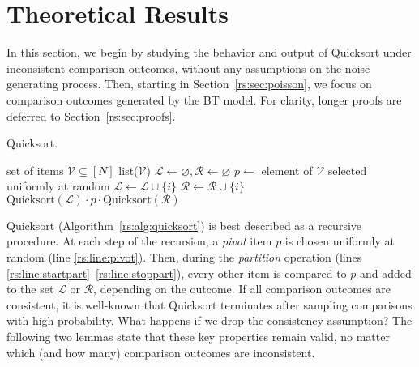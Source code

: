 \section{Theoretical Results}  %
\label{rs:sec:theory}

In this section, we begin by studying the behavior and output of Quicksort under inconsistent comparison outcomes, without any assumptions on the noise generating process.
Then, starting in Section~\ref{rs:sec:poisson}, we focus on comparison outcomes generated by the BT model.
For clarity, longer proofs are deferred to Section~\ref{rs:sec:proofs}.

\begin{algorithm}[t]
   \caption{Quicksort.}
   \label{rs:alg:quicksort}
\begin{algorithmic}[1]
   \Require set of items $\mathcal{V} \subseteq [N]$
    \Return list($\mathcal{V}$)
   \State $\mathcal{L} \gets \varnothing, \mathcal{R} \gets \varnothing$
   \State $p \gets $ element of $\mathcal{V}$ selected uniformly at random \label{rs:line:pivot}
    \label{rs:line:startpart}
      \label{rs:line:comp}
       \State $\mathcal{L} \gets \mathcal{L} \cup \{i\}$
     \Else
       \State $\mathcal{R} \gets \mathcal{R} \cup \{i\}$
     \EndIf
   \EndFor  \label{rs:line:stoppart}
   \State \Return $\text{Quicksort}(\mathcal{L}) \cdot p \cdot \text{Quicksort}(\mathcal{R})$ \label{rs:line:return}
\end{algorithmic}
\end{algorithm}

Quicksort (Algorithm~\ref{rs:alg:quicksort}) is best described as a recursive procedure.
At each step of the recursion, a \emph{pivot} item $p$ is chosen uniformly at random (line \ref{rs:line:pivot}).
Then, during the \emph{partition} operation (lines \ref{rs:line:startpart}--\ref{rs:line:stoppart}), every other item is compared to $p$ and added to the set $\mathcal{L}$ or $\mathcal{R}$, depending on the outcome.
If all comparison outcomes are consistent, it is well-known that Quicksort terminates after sampling  comparisons with high probability.
What happens if we drop the consistency assumption?
The following two lemmas state that these key properties remain valid, no matter which (and how many) comparison outcomes are inconsistent.

